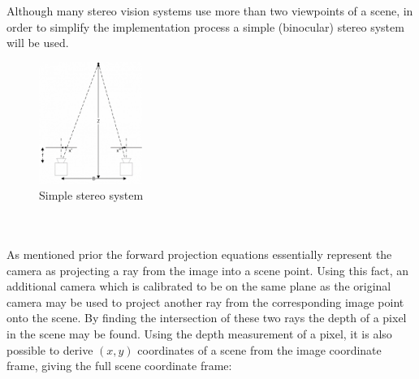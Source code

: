 \documentclass[11pt]{scrartcl}
\begin{document}
\begin{remark}
	Although many stereo vision systems use more than two viewpoints of a scene,
	in order to simplify the implementation process a simple (binocular) stereo
	system will be used.
\end{remark}
\begin{figure}
	\centering
	\includegraphics[width=0.3\textwidth]{img2.resized.png}
	\caption{\label{fig:frog2}Simple stereo system}
\end{figure}
\\
\\

As mentioned prior the forward projection equations essentially represent the camera
as projecting a ray from the image into a scene point. Using this fact, an
additional camera which is calibrated to be on the same plane as the original camera
may be used to project another ray from the corresponding image point onto the scene. By
finding the intersection of these two rays the depth of a pixel in the scene may be found. Using the depth measurement of a pixel, it is also possible to derive
$(x, y)$ coordinates of a scene from the image coordinate frame, giving
the full scene coordinate frame:
\end{document}
